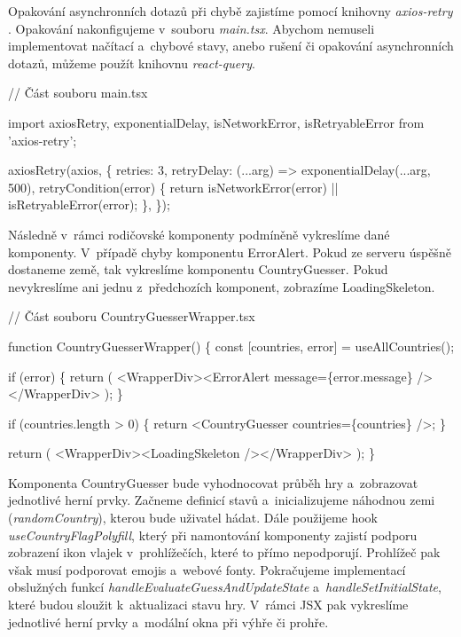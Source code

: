 Opakování asynchronních dotazů při chybě zajistíme pomocí knihovny \emph{axios-retry} \cite{axiosretrylib}. Opakování nakonfigujeme v~souboru \emph{main.tsx}. 
Abychom nemuseli implementovat načítací a~chybové stavy, anebo rušení či opakování asynchronních dotazů, můžeme použít knihovnu \emph{react-query}.

\begin{prog}
// Část souboru main.tsx

import axiosRetry, {exponentialDelay, isNetworkError, isRetryableError}
from 'axios-retry';

axiosRetry(axios, \{
  retries: 3,
  retryDelay: (...arg) => exponentialDelay(...arg, 500),
  retryCondition(error) \{
    return isNetworkError(error) || isRetryableError(error);
  \},
\});
\end{prog}

Následně v~rámci rodičovské komponenty podmíněně vykreslíme dané komponenty. V~případě chyby komponentu ErrorAlert. Pokud ze serveru úspěšně dostaneme země, tak vykreslíme komponentu CountryGuesser. 
Pokud nevykreslíme ani jednu z~předchozích komponent, zobrazíme LoadingSkeleton.

\begin{prog}
// Část souboru CountryGuesserWrapper.tsx

function CountryGuesserWrapper() \{
  const [countries, error] = useAllCountries();

  if (error) \{
    return (
      <WrapperDiv><ErrorAlert message=\{error.message\} /></WrapperDiv>
    );
  \}

  if (countries.length > 0) \{
    return <CountryGuesser countries=\{countries\} />;
  \}

  return (
    <WrapperDiv><LoadingSkeleton /></WrapperDiv>
  );
\}
\end{prog}

Komponenta CountryGuesser bude vyhodnocovat průběh hry a~zobrazovat jednotlivé herní prvky. Začneme definicí stavů a~inicializujeme náhodnou zemi (\emph{randomCountry}), kterou bude uživatel hádat. 
Dále použijeme hook \emph{useCountryFlagPolyfill}, který při namontování komponenty zajistí podporu zobrazení ikon vlajek v~prohlížečích, které to přímo nepodporují. 
Prohlížeč pak však musí podporovat emojis a~webové fonty. Pokračujeme implementací obslužných funkcí \emph{handleEvaluateGuessAndUpdateState} a~\emph{handleSetInitialState}, které budou sloužit k~aktualizaci stavu hry. 
V~rámci JSX pak vykreslíme jednotlivé herní prvky a~modální okna při výhře či prohře.

